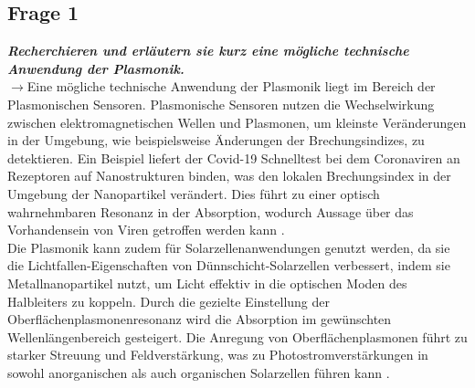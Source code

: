\subsection{\label{subsec:FZV1}Frage 1}
\textbf{\textit{Recherchieren und erläutern sie kurz eine mögliche technische Anwendung der Plasmonik.}}\\
$\rightarrow$Eine mögliche technische Anwendung der Plasmonik liegt im Bereich der Plasmonischen Sensoren. 
Plasmonische Sensoren nutzen die Wechselwirkung zwischen elektromagnetischen Wellen und Plasmonen, 
um kleinste Veränderungen in der Umgebung, wie beispielsweise Änderungen der Brechungsindizes, zu detektieren.
Ein Beispiel liefert der Covid-19 Schnelltest bei dem Coronaviren an Rezeptoren auf Nanostrukturen binden, 
was den lokalen Brechungsindex in der Umgebung der Nanopartikel verändert. 
Dies führt zu einer optisch wahrnehmbaren Resonanz in der Absorption, wodurch Aussage über das Vorhandensein
von Viren getroffen werden kann \cite{FZV1p1}. \\ 
Die Plasmonik kann zudem für Solarzellenanwendungen genutzt werden, da sie 
die Lichtfallen-Eigenschaften von Dünnschicht-Solarzellen verbessert, 
indem sie Metallnanopartikel nutzt, um Licht effektiv in die optischen Moden des Halbleiters zu koppeln. 
Durch die gezielte Einstellung der Oberflächenplasmonenresonanz wird die Absorption im gewünschten 
Wellenlängenbereich gesteigert. Die Anregung von Oberflächenplasmonen führt zu starker Streuung 
und Feldverstärkung, was zu Photostromverstärkungen in sowohl anorganischen als auch organischen 
Solarzellen führen kann \cite{FZV1}.